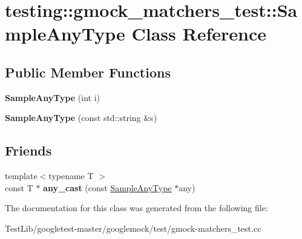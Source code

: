 \hypertarget{classtesting_1_1gmock__matchers__test_1_1SampleAnyType}{}\section{testing\+:\+:gmock\+\_\+matchers\+\_\+test\+:\+:Sample\+Any\+Type Class Reference}
\label{classtesting_1_1gmock__matchers__test_1_1SampleAnyType}
\subsection*{Public Member Functions}
\begin{DoxyCompactItemize}
\item 
\mbox{\label{classtesting_1_1gmock__matchers__test_1_1SampleAnyType_a8f77e083452210341cb9552fccb4aeab}} 
{\bfseries Sample\+Any\+Type} (int i)
\item 
\mbox{\label{classtesting_1_1gmock__matchers__test_1_1SampleAnyType_a1a9abd19e3f7ca8bc78c05fc5ee2299e}} 
{\bfseries Sample\+Any\+Type} (const std\+::string \&s)
\end{DoxyCompactItemize}
\subsection*{Friends}
\begin{DoxyCompactItemize}
\item 
\mbox{\label{classtesting_1_1gmock__matchers__test_1_1SampleAnyType_a5f0f90347eeb986f111c81e6592a74e6}} 
{\footnotesize template$<$typename T $>$ }\\const T $\ast$ {\bfseries any\+\_\+cast} (const \hyperlink{classtesting_1_1gmock__matchers__test_1_1SampleAnyType}{Sample\+Any\+Type} $\ast$any)
\end{DoxyCompactItemize}


The documentation for this class was generated from the following file\+:\begin{DoxyCompactItemize}
\item 
Test\+Lib/googletest-\/master/googlemock/test/gmock-\/matchers\+\_\+test.\+cc\end{DoxyCompactItemize}
